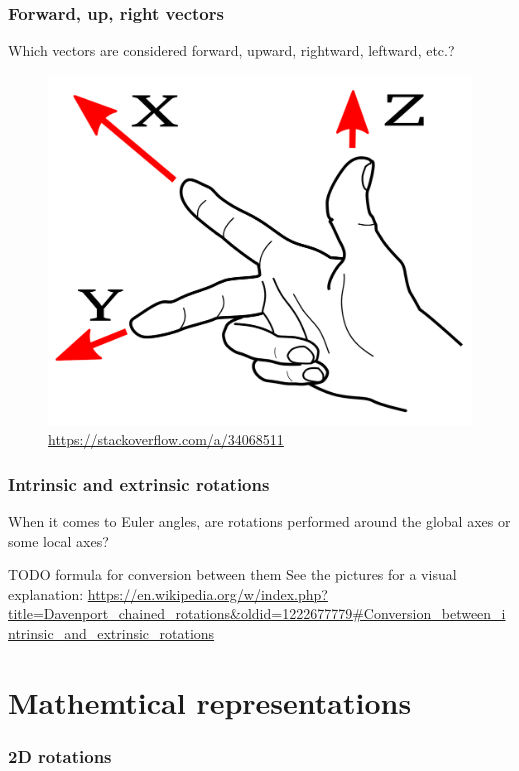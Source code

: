\documentclass{beamer}
\begin{document}
\begin{frame}
\frametitle{Forward, up, right vectors}
Which vectors are considered forward, upward, rightward, leftward, etc.?
\begin{figure}
    \centering
    \includegraphics[width=0.8\textheight]{assets/fingers.png}
	\caption*{\url{https://stackoverflow.com/a/34068511}}
\end{figure}
\end{frame}

\begin{frame}
\frametitle{Intrinsic and extrinsic rotations}
When it comes to Euler angles, are rotations performed around the global axes or some local axes?

TODO formula for conversion between them
\vfill 	
See the pictures for a visual explanation:
\url{https://en.wikipedia.org/w/index.php?title=Davenport_chained_rotations&oldid=1222677779\#Conversion_between_intrinsic_and_extrinsic_rotations}
\end{frame}
        

\section{Mathemtical representations}


\begin{frame}
\frametitle{2D rotations}
\end{frame}
\end{document}
